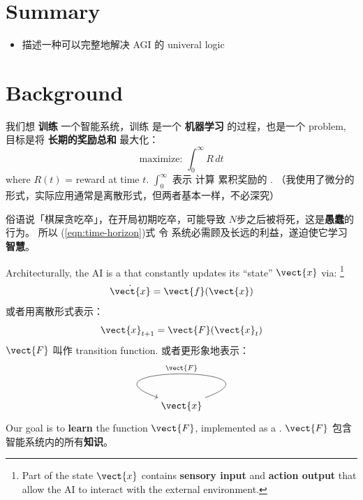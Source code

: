 \maketitle

\section*{Summary}
\begin{itemize}
	\item 描述一种可以完整地解决 AGI 的 univeral logic
\end{itemize}

\tableofcontents

 \setcounter{section}{-1}
\section{Background}

我们想 \textbf{训练} 一个智能系统，训练 是一个 \textbf{机器学习} 的过程，也是一个  problem, 目标是将 \textbf{长期的奖励总和} 最大化：
\begin{equation}
\label{eqn:time-horizon}
\mbox{maximize: } \int_0^{\infty} R \, dt
\end{equation}
where $R(t)$ = reward at time $t$.  $\int_0^{\infty}$ 表示 计算 累积奖励的 .  （我使用了微分的形式，实际应用通常是离散形式，但两者基本一样，不必深究）

俗语说「棋屎贪吃卒」，在开局初期吃卒，可能导致 $N$步之后被将死，这是\textbf{愚蠢}的行为。 所以 (\ref{eqn:time-horizon})式 令 系统必需顾及长远的利益，遂迫使它学习 \textbf{智慧}。

Architecturally, the AI is a  that constantly updates its ``state'' $\vect{x}$ via: \footnote{Part of the state $\vect{x}$ contains \textbf{sensory input} and \textbf{action output} that allow the AI to interact with the external environment.}
\begin{equation}
\dot{\vect{x}} = \vect{f}(\vect{x})
\end{equation}
或者用离散形式表示：
\begin{equation}
\vect{x}_{t+1} = \vect{F}(\vect{x}_t)
\end{equation}
$\vect{F}$ 叫作 transition function.  或者更形象地表示：
\begin{equation}
\label{eqn:AGI-architecture}
\begin{tikzcd}
\vect{x} \arrow[in=160,out=20,loop,looseness=5,swap,"\vect{F}"]
\end{tikzcd}
\end{equation}
Our goal is to \textbf{learn} the function $\vect{F}$, implemented as a .  $\vect{F}$ 包含智能系统内的所有\textbf{知识}。 

